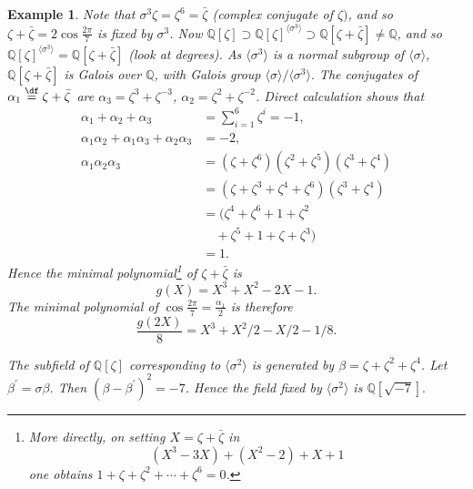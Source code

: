 \documentclass[a4paper,11pt,final,openany]{memoir}
\newtheorem{example}[X]{Example}
\theoremstyle{nonumberplain}
\begin{document}
\begin{example}
Note that $\sigma^{3}\zeta=\zeta^{6}=\bar{\zeta}$ (complex conjugate of
$\zeta)$, and so $\zeta+\bar{\zeta}=2\cos\frac{2\pi}{7}$ is fixed by
$\sigma^{3}$. Now $\mathbb{Q}{}[\zeta]\supset\mathbb{Q}{}[\zeta]^{\langle
\sigma^{3}\rangle}\supset\mathbb{Q}{}[\zeta+\bar{\zeta}]\neq\mathbb{Q}{}$, and
so $\mathbb{Q}{}[\zeta]^{\langle\sigma^{3}\rangle}=\mathbb{Q}{}[\zeta
+\bar{\zeta}]$ (look at degrees). As $\langle{}\sigma^{3}\rangle$ is a normal
subgroup of $\langle{}\sigma\rangle$, $\mathbb{Q}[\zeta+\bar{\zeta}]$ is
Galois over $\mathbb{Q}$, with Galois group $\langle{}\sigma\rangle/\langle
{}\sigma^{3}\rangle.$ The conjugates of $\alpha_{1}%
\overset{\df}{=}\zeta+\bar{\zeta}$ are $\alpha_{3}=\zeta
^{3}+\zeta^{-3}$, $\alpha_{2}=\zeta^{2}+\zeta^{-2}$. Direct calculation shows
that
\begin{align*}
\alpha_{1}+\alpha_{2}+\alpha_{3}  &  =\sum\nolimits_{i=1}^{6}\zeta^{i}=-1,\\
\alpha_{1}\alpha_{2}+\alpha_{1}\alpha_{3}+\alpha_{2}\alpha_{3}  &  =-2,\\
\alpha_{1}\alpha_{2}\alpha_{3}  &  =(\zeta+\zeta^{6})(\zeta^{2}+\zeta
^{5})(\zeta^{3}+\zeta^{4})\\
&  =(\zeta+\zeta^{3}+\zeta^{4}+\zeta^{6})(\zeta^{3}+\zeta^{4})\\
&  =(\zeta^{4}+\zeta^{6}+1+\zeta^{2}\\
& \quad +\zeta^{5}+1+\zeta+\zeta^{3})\\
&  =1.
\end{align*}
Hence the minimal polynomial\footnote{More directly, on setting $X=\zeta
+\bar{\zeta}$ in%
\[
(X^{3}-3X)+(X^{2}-2)+X+1
\]
one obtains $1+\zeta+\zeta^{2}+\cdots+\zeta^{6}=0$.} of $\zeta+\bar{\zeta}$
is
\[
g(X)=X^{3}+X^{2}-2X-1.
\]
The minimal polynomial of $\cos\frac{2\pi}{7}=\frac{\alpha_{1}}{2}$ is
therefore
\[
\frac{g(2X)}{8}=X^{3}+X^{2}/2-X/2-1/8.
\]


The subfield of $\mathbb{Q}[\zeta]$ corresponding to $\langle{}\sigma
^{2}\rangle$ is generated by $\beta=\zeta+\zeta^{2}+\zeta^{4}$. Let
$\beta^{\prime}=\sigma\beta$. Then $(\beta-\beta^{\prime})^{2}=-7$. Hence the
field fixed by $\langle{}\sigma^{2}\rangle$ is $\mathbb{Q}[\sqrt{-7}].$
\end{example}
\end{document}

